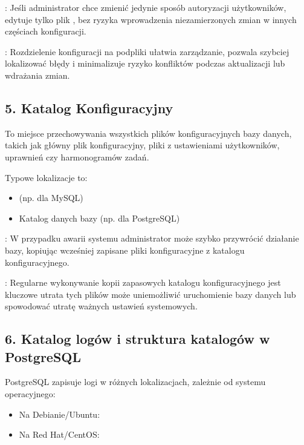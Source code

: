 \documentclass[letterpaper,10pt,polish]{sphinxmanual}
\begin{document}
\sphinxAtStartPar
{}: Jeśli administrator chce zmienić jedynie sposób autoryzacji użytkowników, edytuje tylko plik , bez ryzyka wprowadzenia niezamierzonych zmian w innych częściach konfiguracji.

\sphinxAtStartPar
{}: Rozdzielenie konfiguracji na podpliki ułatwia zarządzanie, pozwala szybciej lokalizować błędy i minimalizuje ryzyko konfliktów podczas aktualizacji lub wdrażania zmian.


\subsection{5. Katalog Konfiguracyjny}
\label{\detokenize{rozdzial2/Konfiguracja_baz_danych/Konfiguracja_baz_danych:katalog-konfiguracyjny}}
\sphinxAtStartPar
To miejsce przechowywania wszystkich plików konfiguracyjnych bazy danych, takich jak główny plik konfiguracyjny, pliki z ustawieniami użytkowników, uprawnień czy harmonogramów zadań.

\sphinxAtStartPar
Typowe lokalizacje to:
\begin{itemize}
\item {} 
\sphinxAtStartPar
{} (np.  dla MySQL)

\item {} 
\sphinxAtStartPar
Katalog danych bazy (np.  dla PostgreSQL)

\end{itemize}

\sphinxAtStartPar
{}: W przypadku awarii systemu administrator może szybko przywrócić działanie bazy, kopiując wcześniej zapisane pliki konfiguracyjne z katalogu konfiguracyjnego.

\sphinxAtStartPar
{}: Regularne wykonywanie kopii zapasowych katalogu konfiguracyjnego jest kluczowe \textendash{} utrata tych plików może uniemożliwić uruchomienie bazy danych lub spowodować utratę ważnych ustawień systemowych.


\subsection{6. Katalog logów i struktura katalogów w PostgreSQL}
\label{\detokenize{rozdzial2/Konfiguracja_baz_danych/Konfiguracja_baz_danych:katalog-logow-i-struktura-katalogow-w-postgresql}}
\sphinxAtStartPar
{}
PostgreSQL zapisuje logi w różnych lokalizacjach, zależnie od systemu operacyjnego:
\begin{itemize}
\item {} 
\sphinxAtStartPar
Na Debianie/Ubuntu: 

\item {} 
\sphinxAtStartPar
Na Red Hat/CentOS: 

\end{itemize}
\end{document}
